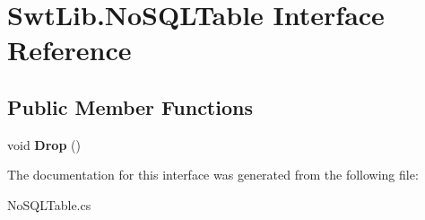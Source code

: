 \hypertarget{interface_swt_lib_1_1_no_s_q_l_table}{\section{Swt\-Lib.\-No\-S\-Q\-L\-Table Interface Reference}
\label{interface_swt_lib_1_1_no_s_q_l_table}
}
\subsection*{Public Member Functions}
\begin{DoxyCompactItemize}
\item 
\hypertarget{interface_swt_lib_1_1_no_s_q_l_table_a9b42e3a43065b3231454c33c90280caf}{void {\bfseries Drop} ()}\label{interface_swt_lib_1_1_no_s_q_l_table_a9b42e3a43065b3231454c33c90280caf}

\end{DoxyCompactItemize}


The documentation for this interface was generated from the following file\-:\begin{DoxyCompactItemize}
\item 
No\-S\-Q\-L\-Table.\-cs\end{DoxyCompactItemize}
